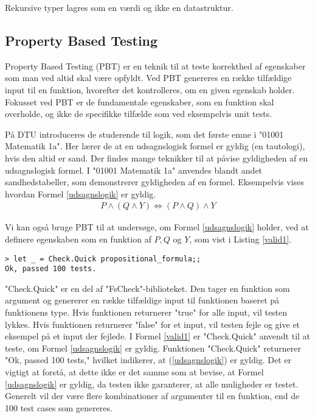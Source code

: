 Rekursive typer lagres som en værdi og ikke en datastruktur.


\subsection{Property Based Testing}
Property Based Testing (PBT) er en teknik til at teste korrekthed af egenskaber som man ved altid skal være opfyldt. Ved PBT genereres en række tilfældige input til en funktion, hvorefter det kontrolleres, om en given egenskab holder. Fokusset ved PBT er de fundamentale egenskaber, som en funktion skal overholde, og ikke de specifikke tilfælde som ved eksempelvis unit tests.

På DTU introduceres de studerende til logik, som det første emne i "01001 Matematik 1a". Her lærer de at en udsagnslogisk formel er gyldig (en tautologi), hvis den altid er sand. Der findes mange teknikker til at påvise gyldigheden af en udsagnslogisk formel. I "01001 Matematik 1a" anvendes blandt andet sandhedstabeller, som demonstrerer gyldigheden af en formel. Eksempelvis vises hvordan Formel \eqref{udsagnslogik} er gyldig.
\begin{gather}
    P \land (Q \land Y) \iff (P \land Q) \land Y
    \label{udsagnslogik}
\end{gather}

Vi kan også bruge PBT til at undersøge, om Formel \eqref{udsagnslogik} holder, ved at definere egenskaben som en funktion af $P, Q$ og $Y$, som vist i Listing \ref{valid1}.




\begin{lstlisting}[style=output, label={lst:output_example}, caption={Output ved PBT af (\ref{udsagnslogik})}]
> let _ = Check.Quick propositional_formula;;
Ok, passed 100 tests.
\end{lstlisting}

"Check.Quick" er en del af "FsCheck"-biblioteket. Den tager en funktion som argument og genererer en række tilfældige input til funktionen baseret på funktionens type. Hvis funktionen returnerer "true" for alle input, vil testen lykkes. Hvis funktionen returnerer "false" for et input, vil testen fejle og give et eksempel på et input der fejlede. I Formel \ref{valid1} er "Check.Quick" anvendt til at teste, om Formel \eqref{udsagnslogik} er gyldig. Funktionen "Check.Quick" returnerer "Ok, passed 100 tests," hvilket indikerer, at (\ref{udsagnslogik}) er gyldig. Det er vigtigt at forstå, at dette ikke er det samme som at bevise, at Formel \eqref{udsagnslogik} er gyldig, da testen ikke garanterer, at alle muligheder er testet. Generelt vil der være flere kombinationer af argumenter til en funktion, end de 100 test cases som genereres.


